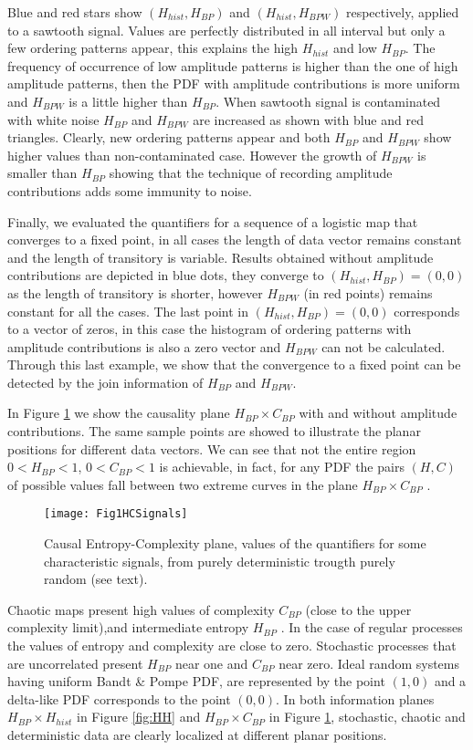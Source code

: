 Blue and red stars show $(H_{hist}, H_{BP})$ and $(H_{hist}, H_{BPW})$ respectively, applied to a sawtooth signal.
Values are perfectly distributed in all interval but only a few ordering patterns appear, this explains the high $H_{hist}$ and low $H_{BP}$.
The frequency of occurrence of low amplitude patterns is higher than the one of high amplitude patterns, then the PDF with amplitude contributions is more uniform and $H_{BPW}$ is a little higher than $H_{BP}$.
When sawtooth signal is contaminated with white noise $H_{BP}$ and $H_{BPW}$ are increased as shown with blue and red triangles.
Clearly, new ordering patterns appear and both $H_{BP}$ and $H_{BPW}$ show higher values than non-contaminated case.
However the growth of $H_{BPW}$ is smaller than $H_{BP}$ showing that the technique of recording amplitude contributions adds some immunity to noise.

Finally, we evaluated the quantifiers for a sequence of a logistic map that converges to a fixed point, in all cases the length of data vector remains constant and the length of transitory is variable.
Results obtained without amplitude contributions are depicted in blue dots, they converge to $(H_{hist}, H_{BP})=(0, 0)$ as the length of transitory is shorter, however $H_{BPW}$ (in red points) remains constant for all the cases.
The last point in $(H_{hist}, H_{BP})=(0, 0)$ corresponds to a vector of zeros, in this case the histogram of ordering patterns with amplitude contributions is also a zero vector and $H_{BPW}$ can not be calculated.
Through this last example, we show that the convergence to a fixed point can be detected by the join information of $H_{BP}$ and $H_{BPW}$.

In Figure \ref{fig:HC} we show the causality plane $H_{BP} \times C_{BP}$ with and without amplitude contributions.
The same sample points are showed to illustrate the planar positions for different data vectors.
We can see that not the entire region $0<H_{BP}<1$, $0<C_{BP}<1$ is achievable, in fact, for any PDF the pairs $(H,C)$ of possible values fall between two extreme curves in the plane $H_{BP} \times C_{BP}$ \cite{Anteneodo1996}.
\begin{figure}[H]
	\centering		
	\texttt{[image: Fig1HCSignals]}
	\caption{Causal Entropy-Complexity plane, values of the quantifiers for some characteristic signals, from purely deterministic trougth purely random (see text).}
	\label{fig:HC}
\end{figure}

Chaotic maps present high values of complexity $C_{BP}$ (close to the upper complexity limit),and intermediate entropy $H_{BP}$ \cite{Rosso2007a,Olivares2012}.
In the case of regular processes the values of entropy and complexity are close to zero. 
Stochastic processes that are uncorrelated present $H_{BP}$ near one and $C_{BP}$ near zero.
Ideal random systems having uniform Bandt \& Pompe PDF, are represented by the point $(1,0)$ \cite{Gonzalez2005} and a delta-like PDF corresponds to the point $(0,0)$.
In both information planes $H_{BP} \times H_{hist}$ in Figure \ref{fig:HH} and $H_{BP} \times C_{BP}$ in Figure \ref{fig:HC}, stochastic, chaotic and deterministic data are clearly localized at different planar positions.

